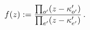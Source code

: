 \begin{equation}
f(z):=\frac{\prod_{o^{\prime }}(z-\kappa _{o^{\prime }}^{\prime })}{%
\prod_{e^{\prime }}(z-\kappa _{e^{\prime }}^{\prime })}\,.
\label{eq:rational}
\end{equation}

